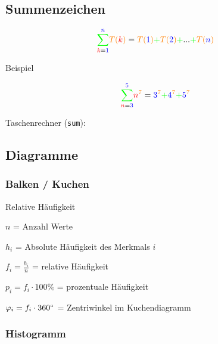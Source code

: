 \begin{multicols}{2}
\subsection*{Summenzeichen}

  $${\color{green}\sum_{{\color{red}k}{{\color{green}{\color{black}=}\color{blue}1}}}^{\color{blue}n\color{green}}}
  {\color{orange}T(}{{\color{red}k}}{\color{orange})} = {\color{orange}T(}{\color{blue}1}{\color{orange})} {\color{green}+} {\color{orange}T(}{\color{blue}2}{\color{orange})} {\color{green}+}
  ... {\color{green}+} {\color{orange}T(}{\color{blue}n}{\color{orange})}$$

Beispiel

  $${\color{green}\sum_{{\color{red}n}{{\color{green}{\color{black}=}\color{blue}3}}}^{\color{blue}5\color{green}}}  {\color{red}n}^{{\color{orange}7}} = {\color{blue}3}^{\color{orange}7} {\color{green}+} {\color{blue}4}^{\color{orange}7} {\color{green}+} {\color{blue}5}^{\color{orange}7}$$


Taschenrechner (\texttt{sum}): 




\subsection*{Diagramme}
\subsubsection*{Balken / Kuchen}
\begin{definition*}{Relative Häufigkeit}{}

$n$ = Anzahl Werte

$h_i$ = Absolute Häufigkeit des Merkmals $i$

$f_i = \frac{h_i}n$ = relative Häufigkeit

$p_i = f_i\cdot{}100\%$ = prozentuale Häufigkeit

$\varphi_i = f_i\cdot{}360^\circ$ = Zentriwinkel im Kuchendiagramm
\end{definition*}



\subsubsection*{Histogramm}


\end{multicols}
